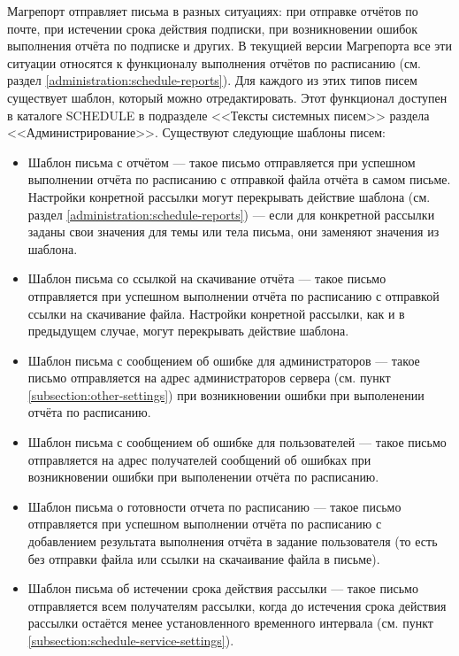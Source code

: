\documentclass[../user-manual.tex]{subfiles}
\begin{document}
	Магрепорт отправляет письма в разных ситуациях: при отправке отчётов по почте, при истечении срока действия подписки, при возникновении ошибок выполнения отчёта по подписке и других. В текущией версии Магрепорта все эти ситуации относятся к функционалу выполнения отчётов по расписанию (см. раздел \ref{administration:schedule-reports}). Для каждого из этих типов писем существует шаблон, который можно отредактировать. Этот функционал доступен в каталоге SCHEDULE в подразделе <<Тексты системных писем>> раздела <<Администрирование>>. Существуют следующие шаблоны писем:
	\begin{itemize}
		\item Шаблон письма с отчётом --- такое письмо отправляется при успешном выполнении отчёта по расписанию с отправкой файла отчёта в самом письме. Настройки конретной рассылки могут перекрывать действие шаблона (см. раздел \ref{administration:schedule-reports}) --- если для конкретной рассылки заданы свои значения для темы или тела письма, они заменяют значения из шаблона.
		
		\item Шаблон письма со ссылкой на скачивание отчёта --- такое письмо отправляется при успешном выполнении отчёта по расписанию с отправкой ссылки на скачивание файла. Настройки конретной рассылки, как и в предыдущем случае, могут перекрывать действие шаблона.
		
		\item Шаблон письма с сообщением об ошибке для администраторов --- такое письмо отправляется на адрес администраторов сервера (см. пункт \ref{subsection:other-settings}) при возникновении ошибки при выполенении отчёта по расписанию.
		
		\item Шаблон письма с сообщением об ошибке для пользователей --- такое письмо отправляется на адрес получателей сообщений об ошибках при возникновении ошибки при выполенении отчёта по расписанию.		
		
		\item Шаблон письма о готовности отчета по расписанию --- такое письмо отправляется при успешном выполнении отчёта по расписанию с добавлением результата выполнения отчёта в задание пользователя (то есть без отправки файла или ссылки на скачаивание файла в письме).
		
		\item Шаблон письма об истечении срока действия рассылки --- такое письмо отправляется всем получателям рассылки, когда до истечения срока действия рассылки остаётся менее установленного временного интервала (см. пункт \ref{subsection:schedule-service-settings}).
		

\end{itemize}
\end{document}

